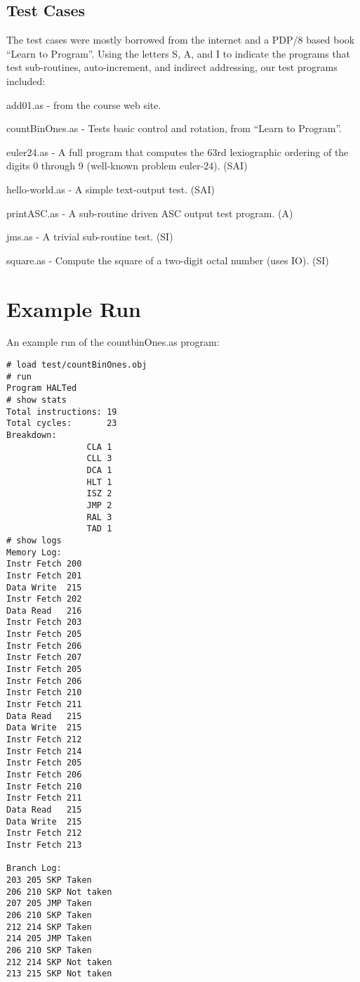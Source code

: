 \documentclass[11pt]{exam}
\begin{document}
\subsection{Test Cases}
The test cases were mostly borrowed from the internet and a PDP/8
based book ``Learn to Program''.  Using the letters S, A, and I to
indicate the programs that test sub-routines, auto-increment, and
indirect addressing, our test programs included:

{\small
\begin{itemize*}
\item add01.as - from the course web site.
\item countBinOnes.as - Tests basic control and rotation, from ``Learn to Program''.
\item euler24.as - A full program that computes the 63rd lexiographic ordering of
  the digits 0 through 9 (well-known problem euler-24). (SAI)
\item hello-world.as - A simple text-output test. (SAI)
\item printASC.as - A sub-routine driven ASC output test program.  (A)
\item jms.as - A trivial sub-routine test. (SI)
\item square.as - Compute the square of a two-digit octal number (uses IO).  (SI)
\end{itemize*}
}

\section{Example Run}
An example run of the countbinOnes.as program:

\begin{multicols}{2}
{\scriptsize
\begin{verbatim}
# load test/countBinOnes.obj
# run
Program HALTed
# show stats
Total instructions: 19
Total cycles:       23
Breakdown:
                CLA 1
                CLL 3
                DCA 1
                HLT 1
                ISZ 2
                JMP 2
                RAL 3
                TAD 1
# show logs
Memory Log:
Instr Fetch 200
Instr Fetch 201
Data Write  215
Instr Fetch 202
Data Read   216
Instr Fetch 203
Instr Fetch 205
Instr Fetch 206
Instr Fetch 207
Instr Fetch 205
Instr Fetch 206
Instr Fetch 210
Instr Fetch 211
Data Read   215
Data Write  215
Instr Fetch 212
Instr Fetch 214
Instr Fetch 205
Instr Fetch 206
Instr Fetch 210
Instr Fetch 211
Data Read   215
Data Write  215
Instr Fetch 212
Instr Fetch 213

Branch Log:
203 205 SKP Taken
206 210 SKP Not taken
207 205 JMP Taken
206 210 SKP Taken
212 214 SKP Taken
214 205 JMP Taken
206 210 SKP Taken
212 214 SKP Not taken
213 215 SKP Not taken
\end{verbatim}
}
\end{multicols}
\end{document}
